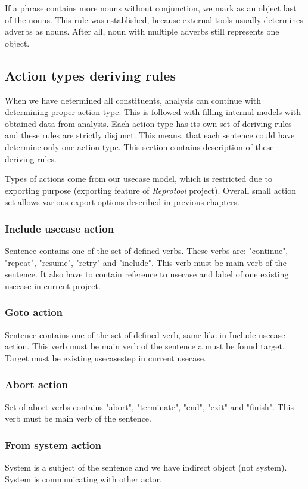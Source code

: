 If a phrase contains more nouns without conjunction, we mark as an object last of the nouns. This rule was established, because external tools usually determines adverbs as nouns. After all, noun with multiple adverbs still represents one object.

\subsection{Action types deriving rules}
\label{sec:actiontypes}
When we have determined all constituents, analysis can continue with determining proper action type. This is followed with filling internal models with obtained data from analysis. Each action type has its own set of deriving rules and these rules are strictly disjunct. This means, that each sentence could have determine only one action type. This section contains description of these deriving rules. 

Types of actions come from our usecase model, which is restricted due to exporting purpose (exporting feature of \emph{Reprotool} project). Overall small action set allows various export options described in previous chapters. 

\subsubsection{Include usecase action}
Sentence contains one of the set of defined verbs. These verbs are: "continue", "repeat", "resume", "retry" and "include".  This verb must be main verb of the sentence. It also have to contain reference to usecase and label of one existing usecase in current project.

\subsubsection{Goto action}
Sentence contains one of the set of defined verb, same like in Include usecase action. This verb must be main verb of the sentence a must be found target. Target must be existing usecasestep in current usecase. 

\subsubsection{Abort action}
Set of abort verbs contains "abort", "terminate", "end", "exit" and "finish".  This verb must be main verb of the sentence.

\subsubsection{From system action}
System is a subject of the sentence and we have indirect object (not system). System is communicating with other actor.


